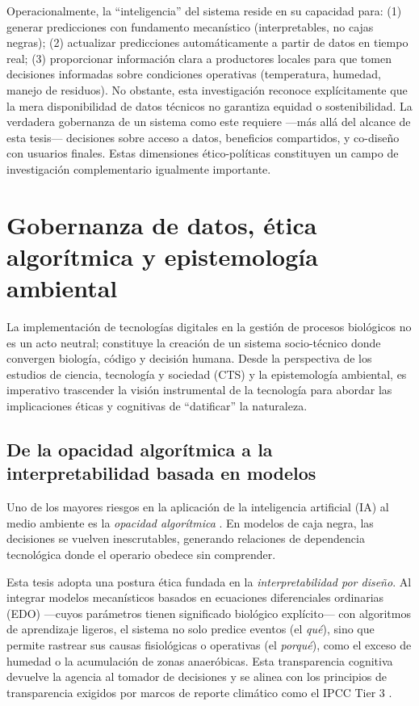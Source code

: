 Operacionalmente, la ``inteligencia'' del sistema reside en su capacidad para: (1) generar 
predicciones con fundamento mecanístico (interpretables, no cajas negras); (2) actualizar 
predicciones automáticamente a partir de datos en tiempo real; (3) proporcionar información 
clara a productores locales para que tomen decisiones informadas sobre condiciones operativas 
(temperatura, humedad, manejo de residuos). No obstante, esta investigación reconoce 
explícitamente que la mera disponibilidad de datos técnicos no garantiza equidad o sostenibilidad. 
La verdadera gobernanza de un sistema como este requiere —más allá del alcance de esta tesis— 
decisiones sobre acceso a datos, beneficios compartidos, y co-diseño con usuarios finales. 
Estas dimensiones ético-políticas constituyen un campo de investigación complementario 
igualmente importante.

\section{Gobernanza de datos, ética algorítmica y epistemología ambiental}

La implementación de tecnologías digitales en la gestión de procesos biológicos no es un acto neutral; constituye la creación de un sistema socio-técnico donde convergen biología, código y decisión humana. Desde la perspectiva de los estudios de ciencia, tecnología y sociedad (CTS) y la epistemología ambiental, es imperativo trascender la visión instrumental de la tecnología para abordar las implicaciones éticas y cognitivas de ``datificar'' la naturaleza.

\subsection{De la opacidad algorítmica a la interpretabilidad basada en modelos}
Uno de los mayores riesgos en la aplicación de la inteligencia artificial (IA) al medio ambiente es la \textit{opacidad algorítmica} \parencite{burrelHowMachineThinks2016}. En modelos de caja negra, las decisiones se vuelven inescrutables, generando relaciones de dependencia tecnológica donde el operario obedece sin comprender.

Esta tesis adopta una postura ética fundada en la \textit{interpretabilidad por diseño}. Al integrar modelos mecanísticos basados en ecuaciones diferenciales ordinarias (EDO) —cuyos parámetros tienen significado biológico explícito— con algoritmos de aprendizaje ligeros, el sistema no solo predice eventos (el \textit{qué}), sino que permite rastrear sus causas fisiológicas o operativas (el \textit{porqué}), como el exceso de humedad o la acumulación de zonas anaeróbicas. Esta transparencia cognitiva devuelve la agencia al tomador de decisiones y se alinea con los principios de transparencia exigidos por marcos de reporte climático como el IPCC Tier 3 \parencite{adadiPeekingBlackBoxSurvey2018}.

